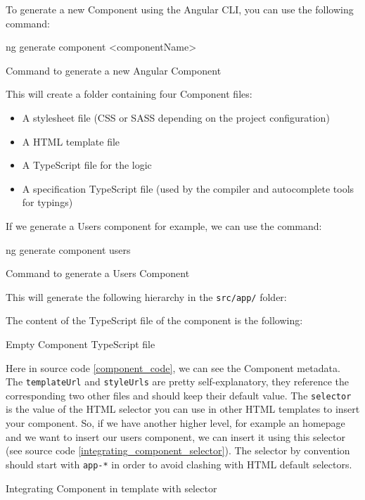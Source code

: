 \documentclass[11pt,a4paper]{report}
\newenvironment{code}{\captionsetup{type=listing}}{}
\begin{document}
To generate a new Component using the Angular CLI, you can use the following command:
\begin{code}
	\begin{shell}
ng generate component <componentName>
	\end{shell}
	\caption{Command to generate a new Angular Component}
\end{code}

This will create a folder containing four Component files:
\begin{itemize}
	\item A stylesheet file (CSS or SASS depending on the project configuration)
	\item A HTML template file
	\item A TypeScript file for the logic
	\item A specification TypeScript file (used by the compiler and autocomplete tools for typings)
\end{itemize}

If we generate a Users component for example, we can use the command:
\begin{code}
	\begin{shell}
ng generate component users
	\end{shell}
	\caption{Command to generate a Users Component}
\end{code}
This will generate the following hierarchy in the \verb+src/app/+ folder:

The content of the TypeScript file of the component is the following:
\begin{code}
	\caption{Empty Component TypeScript file}
	\label{component_code}
\end{code}

Here in source code \ref{component_code}, we can see the Component metadata. The \verb+templateUrl+ and \verb+styleUrls+ are pretty self-explanatory, they reference the corresponding two other files and should keep their default value. The \verb+selector+ is the value of the HTML selector you can use in other HTML templates to insert your component. So, if we have another higher level, for example an homepage and we want to insert our users component, we can insert it using this selector (see source code \ref{integrating_component_selector}). The selector by convention should start with \verb+app-*+ in order to avoid clashing with HTML default selectors.
\begin{code}
	\caption{Integrating Component in template with selector}
	\label{integrating_component_selector}
\end{code}
\end{document}
